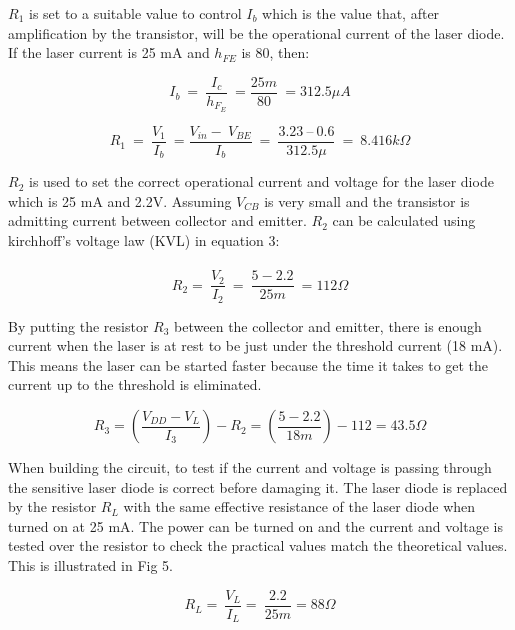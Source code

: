 \documentclass[conference]{IEEEtran}
\begin{document}
$R_{1}$ is set to a suitable value to control $I_{b}$ which is the value that, after amplification by the transistor, will be the operational current of the laser diode. If the laser current is 25 mA and $h_{FE}$ is 80, then:

\begin{equation}
I_b\ =\ \frac{I_c}{h_F_E}\ =\frac{25m}{80}\ = 312.5 \mu{}A
\end{equation}

\begin{equation}
R_1\ =\ \frac{V_1}{I_b}\ =\frac{V_{in}-\ V_{BE}}{I_b}\ =\ \frac{3.23\ –\
0.6}{312.5\mu{}}\ =\ 8.416 k\Omega{}
\end{equation}

$R_{2}$ is used to set the correct operational current and voltage for the laser diode which is 25 mA and 2.2V. Assuming $V_{CB}$ is very small and the transistor is admitting current between collector and emitter. $R_{2}$ can be calculated using kirchhoff's voltage law (KVL) in equation 3:
\\\\
\begin{equation}
R_2=\ \frac{V_2}{I_2}\ =\ \frac{5 - 2.2}{25m}\ =112\Omega{}
\end{equation}

By putting the resistor $R_{3}$ between the collector and emitter, there is enough current when the laser is at rest to be just under the threshold current (18 mA). This means the laser can be started faster because the time it takes to get the current up to the threshold is eliminated.

\begin{equation}
R_3=\left(\frac{V_{DD}-V_L}{I_3}\right)-R_2=\left(\frac{5-2.2}{18m}\right)-112=43.5\Omega{}
\end{equation}

When building the circuit, to test if the current and voltage is passing through the sensitive laser diode is correct before damaging it. The laser diode is replaced by the resistor $R_{L}$ with the same effective resistance of the laser diode when turned on at 25 mA. The power can be turned on and the current and voltage is tested over the resistor to check the practical values match the theoretical values. This is illustrated in Fig 5. 

\begin{equation}
R_L=\ \frac{V_L}{I_L}=\ \frac{2.2}{25m}=88\Omega{}
\end{equation}
\end{document}
